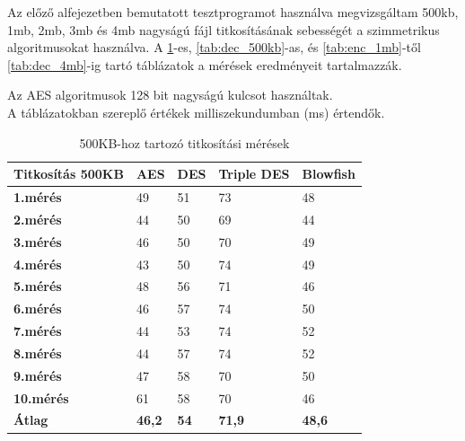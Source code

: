 \noindent Az előző alfejezetben bemutatott tesztprogramot használva megvizsgáltam 500kb, 1mb, 2mb, 3mb és 4mb nagyságú fájl titkosításának sebességét a szimmetrikus algoritmusokat használva. A \ref{tab:enc_500kb}-es, \ref{tab:dec_500kb}-as, és \ref{tab:enc_1mb}-től \ref{tab:dec_4mb}-ig tartó táblázatok a mérések eredményeit tartalmazzák.

Az AES algoritmusok 128 bit nagyságú kulcsot használtak. \\A táblázatokban szereplő értékek milliszekundumban (ms) értendők.
\vspace{5pt}
\begin{table}[H]
	\centering
	\caption{500KB-hoz tartozó titkosítási mérések}
	\label{tab:enc_500kb}
	\medskip
	\begin{tabular}{|p{2.4cm}|p{2cm}|p{2cm}|p{2cm}|p{2cm}|}
		\hline
		\textbf{Titkosítás} \newline \textbf{500KB} & \textbf{AES} & \textbf{DES} & \textbf{Triple DES} & \textbf{Blowfish}\\
		\hline
		\textbf{1.mérés} & 49 & 51 & 73 & 48\\
		\hline
		\textbf{2.mérés} & 44 & 50 & 69 & 44\\
		\hline
		\textbf{3.mérés} & 46 & 50 & 70 & 49\\
		\hline
		\textbf{4.mérés} & 43 & 50 & 74 & 49\\
		\hline
		\textbf{5.mérés} & 48 & 56 & 71 & 46\\
		\hline
		\textbf{6.mérés} & 46 & 57 & 74 & 50\\
		\hline
		\textbf{7.mérés} & 44 & 53 & 74 & 52\\
		\hline
		\textbf{8.mérés} & 44 & 57 & 74 & 52\\
		\hline
		\textbf{9.mérés} & 47 & 58 & 70 & 50\\
		\hline
		\textbf{10.mérés} & 61 & 58 & 70 & 46\\
		\hline
		\hline
		\textbf{Átlag} & \textbf{46,2} & \textbf{54} & \textbf{71,9} & \textbf{48,6}\\
		\hline
	\end{tabular}
\end{table}

